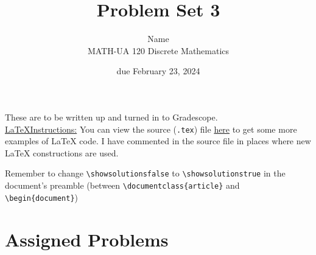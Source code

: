 \documentclass{article}
\title{Problem Set 3}
\author{%
    Name
\\  MATH-UA 120 Discrete Mathematics
}
\date{due February 23, 2024}
\newif\ifshowsolutions
\newcommand{\danger}{\marginpar[\hfill\dbend]{\dbend\hfill}}
\theoremstyle{definition}
\begin{document}
\maketitle



These are to be written up and turned in to Gradescope.\\



\ifshowsolutions
    \SetupExSheets{solution/print=true}
\else
    \danger
 \underline{ \LaTeX  Instructions:}  You can view the source (\texttt{.tex}) file \href{https://bit.ly/3SUfBCS}{here} to get some more examples of \LaTeX{} code.  I have commented in the source file in places where new \LaTeX{} constructions are used.
  
  Remember to change \verb|\showsolutionsfalse| to \verb|\showsolutionstrue|
    in the document's preamble 
    (between \verb|\documentclass{article}| and \verb|\begin{document}|)
\fi

\section*{Assigned Problems}
\end{document}
